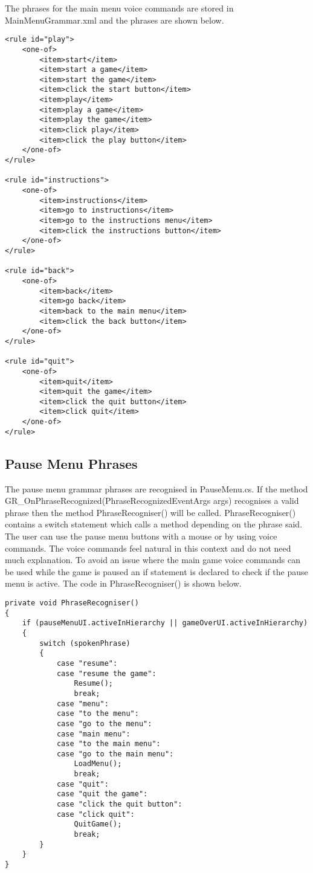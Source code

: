 \documentclass{article}
\begin{document}
The phrases for the main menu voice commands are stored in MainMenuGrammar.xml and the phrases are shown below.
\begin{verbatim}
<rule id="play">
    <one-of>
        <item>start</item>
        <item>start a game</item>
        <item>start the game</item>
        <item>click the start button</item>
        <item>play</item>
        <item>play a game</item>
        <item>play the game</item>
        <item>click play</item>
        <item>click the play button</item>
    </one-of>
</rule>

<rule id="instructions">
    <one-of>
        <item>instructions</item>
        <item>go to instructions</item>
        <item>go to the instructions menu</item>
        <item>click the instructions button</item>
    </one-of>
</rule>

<rule id="back">
    <one-of>
        <item>back</item>
        <item>go back</item>
        <item>back to the main menu</item>
        <item>click the back button</item>
    </one-of>
</rule>

<rule id="quit">
    <one-of>
        <item>quit</item>
        <item>quit the game</item>
        <item>click the quit button</item>
        <item>click quit</item>
    </one-of>
</rule>
\end{verbatim}

\subsection{Pause Menu Phrases}
The pause menu grammar phrases are recognised in PauseMenu.cs. If the method GR\_OnPhraseRecognized(PhraseRecognizedEventArgs args) recognises a valid phrase then the method PhraseRecogniser() will be called. PhraseRecogniser() contains a switch statement which calls a method depending on the phrase said. The user can use the pause menu buttons with a mouse or by using voice commands. The voice commands feel natural in this context and do not need much explanation. To avoid an issue where the main game voice commands can be used while the game is paused an if statement is declared to check if the pause menu is active. The code in PhraseRecogniser() is shown below.
\begin{verbatim}
private void PhraseRecogniser()
{
    if (pauseMenuUI.activeInHierarchy || gameOverUI.activeInHierarchy)
    {
        switch (spokenPhrase)
        {
            case "resume":
            case "resume the game":
                Resume();
                break;
            case "menu":
            case "to the menu":
            case "go to the menu":
            case "main menu":
            case "to the main menu":
            case "go to the main menu":
                LoadMenu();
                break;
            case "quit":
            case "quit the game":
            case "click the quit button":
            case "click quit":
                QuitGame();
                break;
        }
    }
}
\end{verbatim}
\end{document}

